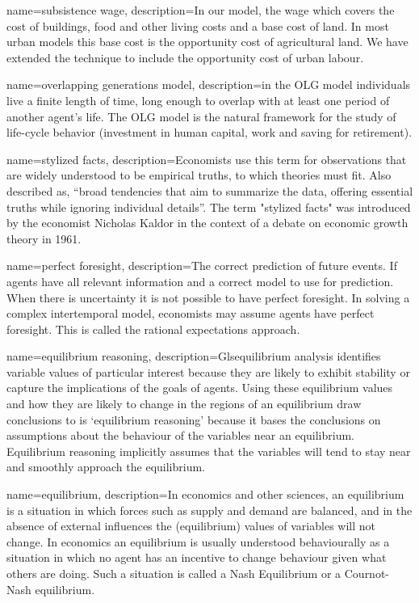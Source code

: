 {
name=subsistence wage,
description={In our model, the wage which covers the cost of buildings, food and other living costs and a base cost of land. In most urban models this base cost is  the opportunity cost of agricultural land. We have extended the technique to include the opportunity cost of urban labour. }
}

{
name=overlapping generations model,
description={in the OLG model individuals live a finite length of time, long enough to overlap with at least one period of another agent's life. The OLG model is the natural framework for the study of life-cycle behavior (investment in human capital, work and saving for retirement).}
}

{
name=stylized facts,
description={Economists use this term for observations that are widely understood to be empirical truths, to which theories must fit.  Also described as, ``broad tendencies that aim to summarize the data, offering essential truths while ignoring individual details''. The term "stylized facts" was introduced by the economist Nicholas Kaldor in the context of a debate on economic growth theory in 1961.\cite{kaldorCapitalAccumulationEconomic1961}}
}

{
name=perfect foresight,
description={The correct prediction of future events. If agents have  all relevant information and  a correct model to use for prediction. When there is uncertainty it is not possible to have perfect foresight. In solving a complex intertemporal model, economists may assume agents have perfect foresight. This is called the rational expectations approach. }
}

{
name=equilibrium reasoning,
description={Gls{equilibrium} analysis identifies variable values of particular interest because they are likely to exhibit stability or capture the implications of the goals of agents. Using these equilibrium values and how they are likely to change in the regions of an equilibrium draw conclusions to is `equilibrium reasoning' because it bases the conclusions on assumptions about the behaviour of the variables near an equilibrium. Equilibrium reasoning implicitly  assumes that the variables will tend to stay near and smoothly approach the equilibrium.}
}

{
name=equilibrium,
description={In economics and other sciences, an equilibrium is a situation in which forces such as supply and demand are balanced, and in the absence of external influences the (equilibrium) values of variables will not change. In economics an equilibrium is usually understood behaviourally as a situation in which no agent has an incentive to change behaviour given what others are doing. Such a situation is called a Nash Equilibrium or a Cournot-Nash equilibrium.}
}


